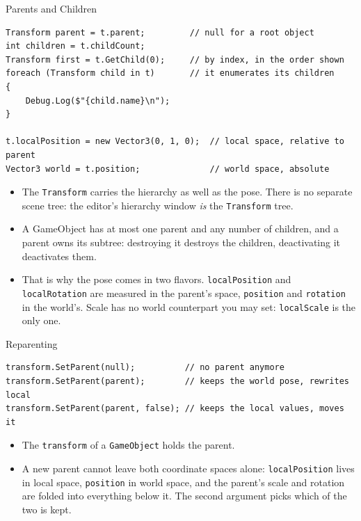 \begin{frame}[fragile]{Parents and Children}
    \begin{lstlisting}[basicstyle=\scriptsize\ttfamily]
Transform parent = t.parent;         // null for a root object
int children = t.childCount;
Transform first = t.GetChild(0);     // by index, in the order shown
foreach (Transform child in t)       // it enumerates its children
{
    Debug.Log($"{child.name}\n");
}

t.localPosition = new Vector3(0, 1, 0);  // local space, relative to parent
Vector3 world = t.position;              // world space, absolute
    \end{lstlisting}
    \vspace{1ex}

    \begin{itemize}
        \item The \texttt{Transform} carries the hierarchy as well as the pose.
        There is no separate scene tree: the editor's hierarchy window
        \emph{is} the \texttt{Transform} tree.
        \item A GameObject has at most one parent and any number of children, and
        a parent owns its subtree: destroying it destroys the children,
        deactivating it deactivates them.
        \item That is why the pose comes in two flavors. \texttt{localPosition}
        and \texttt{localRotation} are measured in the parent's space,
        \texttt{position} and \texttt{rotation} in the world's. Scale has no
        world counterpart you may set: \texttt{localScale} is the only one.
    \end{itemize}
\end{frame}

\begin{frame}[fragile]{Reparenting}
    \begin{lstlisting}[basicstyle=\scriptsize\ttfamily]
transform.SetParent(null);          // no parent anymore
transform.SetParent(parent);        // keeps the world pose, rewrites local
transform.SetParent(parent, false); // keeps the local values, moves it
    \end{lstlisting}
    \vspace{1ex}

    \begin{itemize}
        \item The \texttt{transform} of a \texttt{GameObject} holds the parent.
        \item A new parent cannot leave both coordinate spaces alone:
        \texttt{localPosition} lives in local space, \texttt{position} in world
        space, and the parent's scale and rotation are folded into everything
        below it. The second argument picks which of the two is kept.
    \end{itemize}
\end{frame}

